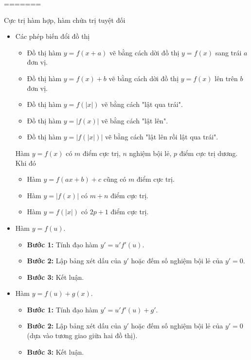 =======
\begin{dang}{Cực trị hàm hợp, hàm chứa trị tuyệt đối}
    \begin{itemize}
        \item Các phép biến đổi đồ thị
        \begin{itemize}
            \item Đồ thị hàm $y=f(x+a)$ vẽ bằng cách dời đồ thị $y=f(x)$ sang trái $a$ đơn vị.
            \item Đồ thị hàm $y=f(x)+b$ vẽ bằng cách dời đồ thị $y=f(x)$ lên trên $b$ đơn vị.
            \item Đồ thị hàm $y=f(|x|)$ vẽ bằng cách "lật qua trái".
            \item Đồ thị hàm $y=|f(x)|$ vẽ bằng cách "lật lên".
            \item Đồ thị hàm $y=|f(|x|)|$ vẽ bằng cách "lật lên rồi lật qua trái".
        \end{itemize}
        \begin{note} Hàm $y=f(x)$ có $m$ điểm cực trị, $n$ nghiệm bội lẻ, $p$ điểm cực trị dương. Khi đó
            \begin{itemize}
                \item[-]Hàm $y=f(ax+b)+c$ cũng có $m$ điểm cực trị.
                \item[-]	Hàm $y=|f(x)|$ có $m+n$  điểm cực trị.
                \item[-] 	Hàm $y=f(|x|)$ có $2p+1$  điểm cực trị.
            \end{itemize}
        \end{note}
        \item Hàm $y=f(u)$.
        \begin{itemize}
            \item \textbf{Bước 1: } Tính đạo hàm $y'=u'f'(u)$.
            \item \textbf{Bước 2: } Lập bảng xét dấu của $y'$ hoặc đếm số nghiệm bội lẻ của $y'=0$.
            \item \textbf{Bước 3: } Kết luận.
        \end{itemize}
        \item Hàm $y=f(u)+g(x)$.
        \begin{itemize}
            \item \textbf{Bước 1: } Tính đạo hàm $y'=u'f'(u)+g'$.
            \item \textbf{Bước 2: } Lập bảng xét dấu của $y'$ hoặc đếm số nghiệm bội lẻ của $y'=0$ (dựa vào tương giao giữa hai đồ thị).
            \item \textbf{Bước 3: } Kết luận.
        \end{itemize}
    \end{itemize}
\end{dang}
